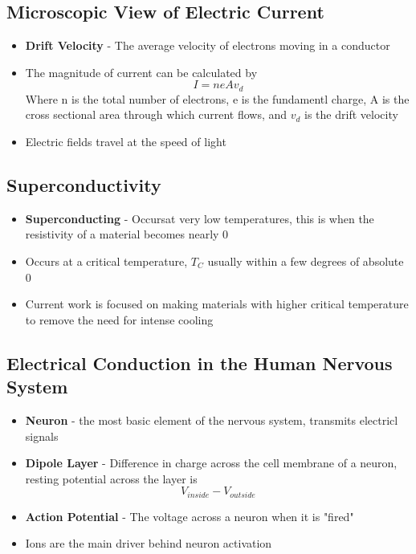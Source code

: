 \subsection{Microscopic View of Electric Current}
\begin{itemize}
    \item \textbf{Drift Velocity} - The average velocity of electrons moving in a conductor
    \item The magnitude of current can be calculated by \[I=neAv_d\] Where n is the total number of electrons, e is the fundamentl charge, A is the cross sectional area through which current flows, and \(v_d\) is the drift velocity
    \item Electric fields travel at the speed of light
\end{itemize}

\subsection{Superconductivity}
\begin{itemize}
    \item \textbf{Superconducting} - Occursat very low temperatures, this is when the resistivity of a material becomes nearly 0
    \item Occurs at a critical temperature, \(T_C\) usually within a few degrees of absolute 0
    \item Current work is focused on making materials with higher critical temperature to remove the need for intense cooling 
\end{itemize}

\subsection{Electrical Conduction in the Human Nervous System}
\begin{itemize}
    \item \textbf{Neuron} - the most basic element of the nervous system, transmits electricl signals
    \item \textbf{Dipole Layer} - Difference in charge across the cell membrane of a neuron, resting potential across the layer is \[V_{inside}-V_{outside}\]
    \item \textbf{Action Potential} - The voltage across a neuron when it is "fired"
    \item Ions are the main driver behind neuron activation
\end{itemize}

\newpage